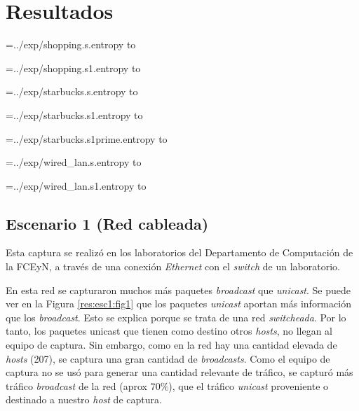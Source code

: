 
\section{Resultados}

\newread\tmp

\openin\tmp=../exp/shopping.s.entropy
\read\tmp to \ShoppingSEntropy
\closein\tmp

\openin\tmp=../exp/shopping.s1.entropy
\read\tmp to \ShoppingSOneEntropy
\closein\tmp

\openin\tmp=../exp/starbucks.s.entropy
\read\tmp to \StarbucksSEntropy
\closein\tmp

\openin\tmp=../exp/starbucks.s1.entropy
\read\tmp to \StarbucksSOneEntropy
\closein\tmp

\openin\tmp=../exp/starbucks.s1prime.entropy
\read\tmp to \StarbucksSOnePrimeEntropy
\closein\tmp

\openin\tmp=../exp/wired_lan.s.entropy
\read\tmp to \WiredLanSEntropy
\closein\tmp

\openin\tmp=../exp/wired_lan.s1.entropy
\read\tmp to \WiredLanSOneEntropy
\closein\tmp


\newcommand\WiredLanNodeCount{207}
\newcommand\ShoppingNodeCount{30}
\newcommand\StarbucksNodeCount{14}


\subsection{Escenario 1 (Red cableada)}

Esta captura se realizó en los laboratorios del Departamento de Computación de la FCEyN, a través de una conexión \emph{Ethernet} con el \emph{switch} de un laboratorio.

En esta red se capturaron muchos más paquetes \emph{broadcast} que \emph{unicast}. Se puede ver en la Figura \ref{res:esc1:fig1}
que los paquetes \emph{unicast} aportan más información que los \emph{broadcast}. Esto se explica porque se trata de una red \emph{switcheada}. Por lo tanto, los paquetes unicast que tienen como destino otros \emph{hosts}, no llegan al equipo de captura. Sin embargo, como en la red hay una cantidad elevada de \emph{hosts} (207), se captura una gran cantidad de \emph{broadcasts}. Como el equipo de captura no se usó para generar una cantidad relevante de tráfico, se capturó más tráfico \emph{broadcast} de la red (aprox 70\%), que el tráfico \emph{unicast} proveniente o destinado a nuestro \emph{host} de captura.

